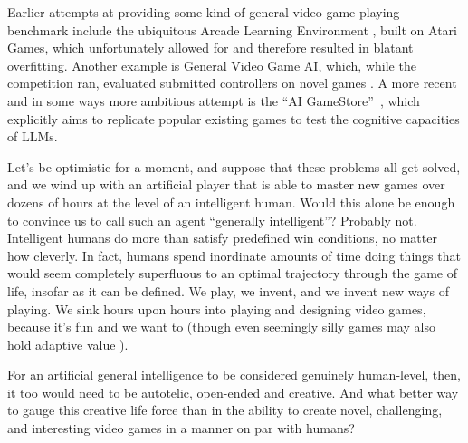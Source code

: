\documentclass[runningheads]{llncs}
\begin{document}
Earlier attempts at providing some kind of general video game playing benchmark include the ubiquitous Arcade Learning Environment \cite{bellemare2013arcade}, built on Atari Games, which unfortunately allowed for and therefore resulted in blatant overfitting. Another example is General Video Game AI, which, while the competition ran, evaluated submitted controllers on novel games \cite{liebana2022general}. A more recent and in some ways more ambitious attempt is the ``AI GameStore''~\cite{ying2026ai}, which explicitly aims to replicate popular existing games to test the cognitive capacities of LLMs.

Let's be optimistic for a moment, and suppose that these problems all get solved, and we wind up with an artificial player that is able to master new games over dozens of hours at the level of an intelligent human. Would this alone be enough to convince us to call such an agent ``generally intelligent''? Probably not. Intelligent humans do more than satisfy predefined win conditions, no matter how cleverly.
In fact, humans spend inordinate amounts of time doing things that would seem completely superfluous to an optimal trajectory through the game of life, insofar as it can be defined. We play, we invent, and we invent new ways of playing. We sink hours upon hours into playing and designing video games, because it's fun and we want to (though even seemingly silly games may also hold adaptive value \cite{chu2024praise}).

For an artificial general intelligence to be considered genuinely human-level, then, it too would need to be autotelic, open-ended and creative. And what better way to gauge this creative life force than in the ability to create novel, challenging, and interesting video games in a manner on par with humans?
\end{document}
